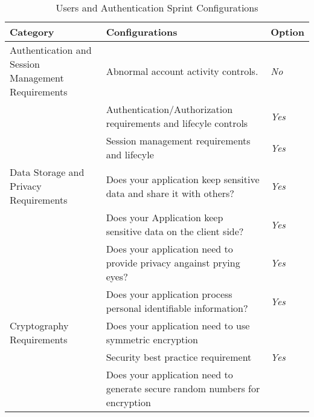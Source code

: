 \begin{table}
    \centering
    \caption{Users and Authentication Sprint Configurations}
    \label{tab:users-and-authentication-config}
    \begin{tabulary}{1.0\textwidth}{|L|L|L|}
        \hline
        \textbf{Category} & \textbf{Configurations} & \textbf{Option} \\
        \hline
        Authentication and Session Management Requirements & Abnormal account activity controls. & \textit{No} \\
                                                           & Authentication/Authorization requirements and lifecyle controls & \textit{Yes} \\
                                                           & Session management requirements and lifecyle & \textit{Yes} \\
                                                           \hline
        Data Storage and Privacy Requirements & Does your application keep sensitive data and share it with others? & \textit{Yes} \\
                                              & Does your Application keep sensitive data on the client side? & \textit{Yes} \\
                                              & Does your application need to provide privacy angainst prying eyes? & \textit{Yes} \\
                                              & Does your application process personal identifiable information? & \textit{Yes} \\
                                              \hline
        Cryptography Requirements & Does your application need to use symmetric encryption &  \\
                                  & Security best practice requirement & \textit{Yes} \\
                                  & Does your application need to generate secure random numbers for encryption &  \\
        \hline
    \end{tabulary}
\end{table}

